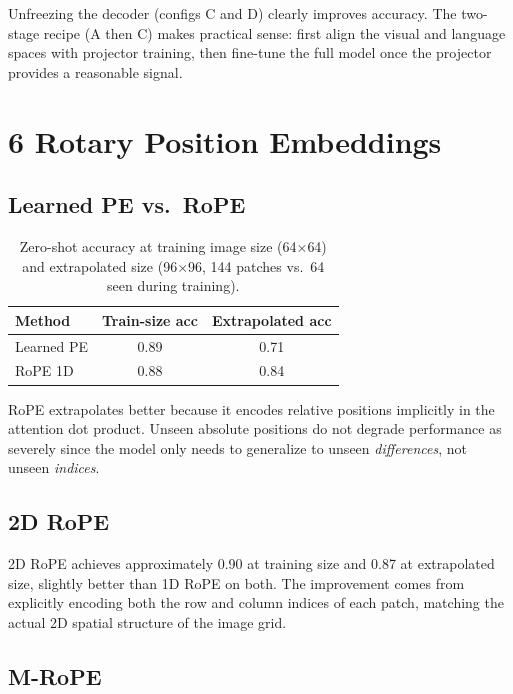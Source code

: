 \documentclass[11pt]{article}
\begin{document}
Unfreezing the decoder (configs C and D) clearly improves accuracy. The
two-stage recipe (A then C) makes practical sense: first align the visual and
language spaces with projector training, then fine-tune the full model once the
projector provides a reasonable signal.

\section*{6 Rotary Position Embeddings}

\subsection*{Learned PE vs.\ RoPE}

\begin{table}[H]
\centering
\begin{tabular}{lcc}
\toprule
Method     & Train-size acc & Extrapolated acc \\
\midrule
Learned PE & 0.89           & 0.71             \\
RoPE 1D    & 0.88           & 0.84             \\
\bottomrule
\end{tabular}
\caption{Zero-shot accuracy at training image size (64$\times$64) and
extrapolated size (96$\times$96, 144 patches vs.\ 64 seen during training).}
\end{table}

RoPE extrapolates better because it encodes relative positions implicitly in
the attention dot product. Unseen absolute positions do not degrade performance
as severely since the model only needs to generalize to unseen
\emph{differences}, not unseen \emph{indices}.

\subsection*{2D RoPE}

2D RoPE achieves approximately 0.90 at training size and 0.87 at extrapolated
size, slightly better than 1D RoPE on both. The improvement comes from
explicitly encoding both the row and column indices of each patch, matching
the actual 2D spatial structure of the image grid.

\subsection*{M-RoPE}
\end{document}
